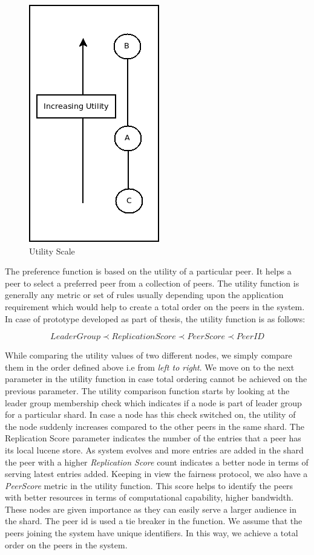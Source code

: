 \documentclass[12pt,a4paper,twoside,openright]{book}
\begin{document}
\begin{figure}[h]
	\centering
	\includegraphics[scale=0.5]{preference}
	\caption{Utility Scale}
	\label{fig:preference}
\end{figure}




\par The preference function is based on the utility of a particular peer. It helps a peer to select a preferred peer from a collection of peers. The utility function is generally any metric or set of rules usually depending upon the application requirement which would help to create a total order on the peers in the system. In case of prototype developed as part of thesis, the utility function is as follows:

\small 
\begin{equation*}
    LeaderGroup \prec ReplicationScore \prec PeerScore \prec PeerID
\end{equation*}
\normalsize

While comparing the utility values of two different nodes, we simply compare them in the order defined above i.e from \textit {left to right}. We move on to the next parameter in the utility function in case total ordering cannot be achieved on the previous parameter. The utility comparison function starts by looking at the leader group membership check which indicates if a node is part of leader group for a particular shard. In case a node has this check switched on, the utility of the node suddenly increases compared to the other peers in the same shard. The Replication Score parameter indicates the number of the entries that a peer has its local lucene store. As system evolves and more entries are added in the shard the peer with a higher \textit{Replication Score} count indicates a better node in terms of serving latest entries added. Keeping in view the fairness protocol, we also have a \textit{PeerScore} metric in the utility function. This score helps to identify the peers with better resources in terms of computational capability, higher bandwidth. These nodes are given importance as they can easily serve a larger audience in the shard. The peer id is used a tie breaker in the function. We assume that the peers joining the system have unique identifiers.  In this way, we achieve a total order on the peers in the system.
\end{document}
